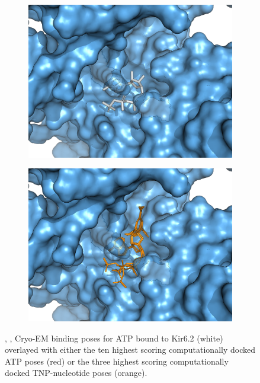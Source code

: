 \begin{figure}[h]
\begin{subfigure}[t]{0.34\textwidth}
	\end{subfigure}
	\vfill
	\begin{subfigure}[t]{0.45\textwidth}
		\caption{}\label{ch3fig:6c3p_bound}
		\centering
		\includegraphics[width=\textwidth]{6c3p_site_bound.png}
	\end{subfigure}
	\hfill
	\begin{subfigure}[t]{0.45\textwidth}
		\caption{}\label{ch3fig:6c3p_docked}
		\centering
		\includegraphics[width=\textwidth]{6c3p_site_docked.png}
	\end{subfigure}
	\caption[TNP-nucleotides can bind with a similar pose to ATP]{
	, ,  Cryo-EM binding poses for ATP bound to Kir6.2 (white) overlayed with either the ten highest scoring computationally docked ATP poses (red) or the three highest scoring computationally docked TNP-nucleotide poses (orange).
}
\end{figure}
